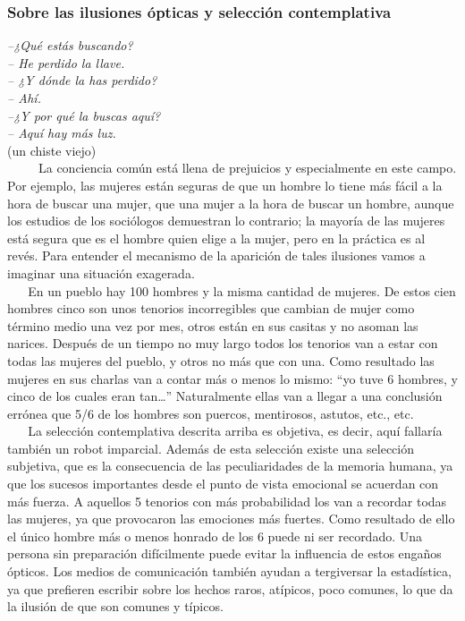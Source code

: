 \hypertarget{sobre-las-ilusiones-uxf3pticas-y-selecciuxf3n-contemplativa}{\subsubsection{Sobre las ilusiones ópticas y selección contemplativa}
\label{sobre-las-ilusiones-uxf3pticas-y-selecciuxf3n-contemplativa}}

\noindent
\emph{
--¿Qué estás buscando? \\
-- He perdido la llave.\\
-- ¿Y dónde la has perdido? \\
-- Ahí.\\
--¿Y por qué la buscas aquí? \\
-- Aquí hay más luz.\\}
(un chiste viejo)\\



~ ~ ~ La conciencia común está llena de prejuicios y especialmente en
este campo. Por ejemplo, las mujeres están seguras de que un hombre lo
tiene más fácil a la hora de buscar una mujer, que una mujer a la hora
de buscar un hombre, aunque los estudios de los sociólogos demuestran lo
contrario; la mayoría de las mujeres está segura que es el hombre quien
elige a la mujer, pero en la práctica es al revés. Para entender el
mecanismo de la aparición de tales ilusiones vamos a imaginar una
situación exagerada.\\
\hspace*{0.333em} ~ ~ En un pueblo hay 100 hombres y la misma cantidad
de mujeres. De estos cien hombres cinco son unos tenorios incorregibles
que cambian de mujer como término medio una vez por mes, otros están en
sus casitas y no asoman las narices. Después de un tiempo no muy largo
todos los tenorios van a estar con todas las mujeres del pueblo, y otros
no más que con una. Como resultado las mujeres en sus charlas van a
contar más o menos lo mismo: ``yo tuve 6 hombres, y cinco de los cuales
eran tan\ldots{}'' Naturalmente ellas van a llegar a una conclusión
errónea que 5/6 de los hombres son puercos, mentirosos, astutos, etc.,
etc.\\
\hspace*{0.333em} ~ ~ La selección contemplativa descrita arriba es
objetiva, es decir, aquí fallaría también un robot imparcial. Además de
esta selección existe una selección subjetiva, que es la consecuencia de
las peculiaridades de la memoria humana, ya que los sucesos importantes
desde el punto de vista emocional se acuerdan con más fuerza. A aquellos
5 tenorios con más probabilidad los van a recordar todas las mujeres, ya
que provocaron las emociones más fuertes. Como resultado de ello el
único hombre más o menos honrado de los 6 puede ni ser recordado. Una
persona sin preparación difícilmente puede evitar la influencia de estos
engaños ópticos. Los medios de comunicación también ayudan a tergiversar
la estadística, ya que prefieren escribir sobre los hechos raros,
atípicos, poco comunes, lo que da la ilusión de que son comunes y
típicos.

